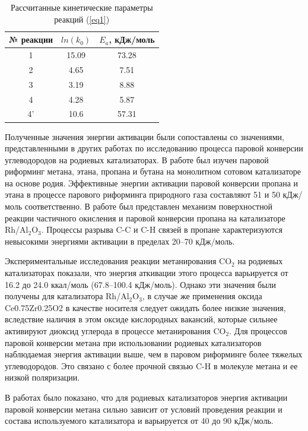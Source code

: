 \documentclass{cmi}
\begin{document}
\begin{table}[h]
\noindent
\caption{Рассчитанные кинетические параметры реакций (\ref{eq1})}
\label{tab:kinetik}
\centering
\begin{tabular}{|c|c|c|}
\hline
\textbf{№ реакции} & \textbf{$ln(k_0)$} & \textbf{$E_a$, кДж/моль} \\
\hline
1   & 15.09  & 73.28 \\
2   & 4.65   & 7.51 \\
3   & 3.19   & 8.88 \\
4   & 4.28   & 5.87 \\
4'  & 10.6   & 57.31 \\
\hline
\end{tabular}
\end{table}
Полученные значения энергии активации были сопоставлены со значениями, представленными в других работах по исследованию процесса паровой конверсии углеводородов на родиевых катализаторах.
В работе  был изучен паровой риформинг метана, этана, пропана и бутана на монолитном сотовом катализаторе на основе родия. Эффективные энергии активации паровой конверсии пропана и этана в процессе парового риформинга природного газа составляют 51 и 50 кДж/моль соответственно.
В работе  был представлен механизм поверхностной реакции частичного окисления и паровой конверсии пропана на катализаторе Rh/Al$_{2}$O$_{3}$. Процессы разрыва C-C и C-H связей в пропане характеризуются невысокими энергиями активации в пределах 20--70 кДж/моль.

Экспериментальные исследования реакции метанирования CO$_{2}$ на родиевых катализаторах  показали, что энергия аткивации этого процесса варьируется от 16.2 до 24.0 ккал/моль (67.8--100.4 кДж/моль). Однако эти значения были получены для катализатора Rh/Al$_{2}$O$_{3}$, в случае же применения оксида Ce0.75Zr0.25O2 в качестве носителя следует ожидать более низкие значения, вследствие наличия в этом оксиде кислородных вакансий, которые сильнее активируют диоксид углерода в процессе метанирования CO$_{2}$. Для процессов паровой конверсии метана при использовании родиевых катализаторов наблюдаемая энергия активации выше, чем в паровом риформинге более тяжелых углеводородов. Это связано с более прочной связью C-H в молекуле метана и ее низкой поляризации.

В работах  было показано, что для родиевых катализаторов энергия активации паровой конверсии метана сильно зависит от условий проведения реакции и состава используемого катализатора и варьируется от 40 до 90 кДж/моль.
\end{document}
